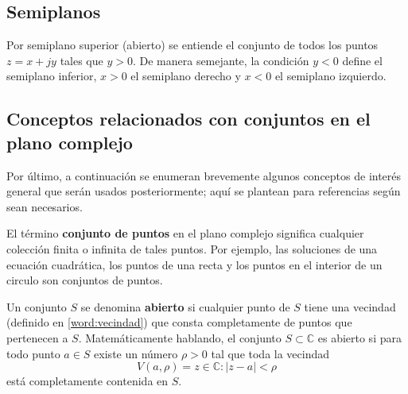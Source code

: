 \subsection{Semiplanos}

Por semiplano superior (abierto) se entiende el conjunto de todos los puntos $z=x+jy$ tales que $y>0$. De manera semejante, la condición $y<0$ define el semiplano inferior, $x>0$ el semiplano derecho y $x<0$ el semiplano izquierdo.

\subsection{Conceptos relacionados con conjuntos en el plano complejo}

Por último, a continuación se enumeran brevemente algunos conceptos de interés general que serán usados posteriormente; aquí se plantean para referencias según sean necesarios.

El término \textbf{conjunto de puntos} en el plano complejo significa cualquier colección finita o infinita de tales puntos. Por ejemplo, las soluciones de una ecuación cuadrática, los puntos de una recta y los puntos en el interior de un circulo son conjuntos de puntos.

Un conjunto $S$ se denomina \textbf{abierto} si cualquier punto de $S$ tiene una vecindad (definido en \ref{word:vecindad}) que consta completamente de puntos que pertenecen a $S$. Matemáticamente hablando, el conjunto $S \subset \mathbb{C}$ es abierto si para todo punto $a \in S$ existe un número $\rho > 0$ tal que toda la vecindad
\[
V(a,\rho) = {z \in \mathbb{C} : |z - a| < \rho}
\]
está completamente contenida en \( S \).

